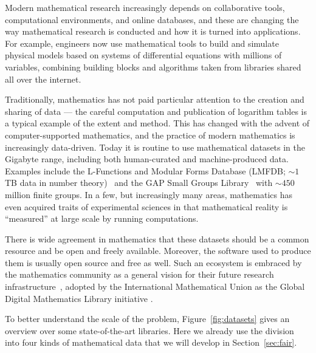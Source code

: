Modern mathematical research increasingly depends on collaborative tools, computational environments, and online databases, and these are changing the way mathematical research is conducted and how it is turned into applications.
For example, engineers now use mathematical tools to build and simulate physical models based on systems of differential equations with millions of variables, combining building blocks and algorithms taken from libraries shared all over the internet.

Traditionally, mathematics has not paid particular attention to the creation and sharing of data --- the careful computation and publication of logarithm tables is a typical example of the extent and method.
This has changed with the advent of computer-supported mathematics, and the practice of modern mathematics is increasingly data-driven.
Today it is routine to use mathematical datasets in the Gigabyte range, including both human-curated and machine-produced data.
Examples include the L-Functions and Modular Forms Database (LMFDB; $\sim 1$ TB data in number theory)~\cite{Cremona:LMFDB16,lmfdb:on} and the GAP Small Groups Library~\cite{GapSmallGroups:on} with $\sim 450$ million finite groups.  
In a few, but increasingly many areas, mathematics has even acquired traits of experimental sciences in that mathematical reality is ``measured'' at large scale by running computations.

There is wide agreement in mathematics that these datasets should be a common resource and be open and freely available.
Moreover, the software used to produce them is usually open source and free as well.
Such an ecosystem is embraced by the mathematics community as a general vision for their future research infrastructure~\cite{NAS14}, adopted by the International Mathematical Union as the Global Digital Mathematics Library initiative \cite{GDML:on}.

To better understand the scale of the problem, Figure~\ref{fig:datasets} gives an overview over some state-of-the-art libraries.
Here we already use the division into four kinds of mathematical data that we will develop in Section~\ref{sec:fair}.

